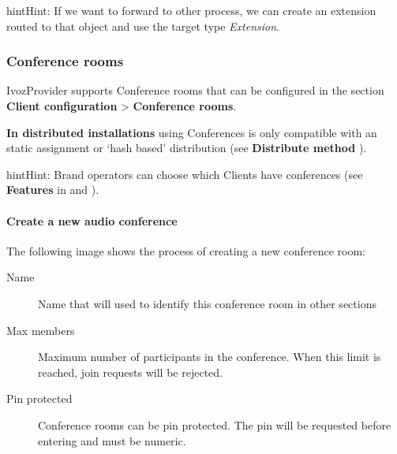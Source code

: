 \documentclass[letterpaper,10pt,english]{sphinxmanual}
\begin{document}
\begin{notice}{hint}{Hint:}
If we want to forward to other process, we can create an extension
routed to that object and use the target type \emph{Extension}.
\end{notice}


\subsubsection{Conference rooms}
\label{administration_portal/client/vpbx/routing_endpoints/conference_rooms::doc}\label{administration_portal/client/vpbx/routing_endpoints/conference_rooms:conference-rooms}\label{administration_portal/client/vpbx/routing_endpoints/conference_rooms:id1}
IvozProvider supports Conference rooms that can be configured in the section
\textbf{Client configuration} \textgreater{} \textbf{Conference rooms}.

\textbf{In distributed installations} using Conferences is only compatible with an static
assignment or `hash based' distribution (see \textbf{Distribute method} {\hyperref[administration_portal/brand/clients/virtual_pbx:virtual\string-pbx]{}}).

\begin{notice}{hint}{Hint:}
Brand operators can choose which Clients have conferences (see \textbf{Features}
in {\hyperref[getting_started/internal_calls/brand_portal:brand\string-configuration]{}} and {\hyperref[getting_started/internal_calls/client_portal:client\string-configuration]{}}).
\end{notice}
\paragraph{Create a new audio conference}

The following image shows the process of creating a new conference room:
\begin{description}
\item[{Name}] \leavevmode{}\label{administration_portal/client/vpbx/routing_endpoints/conference_rooms:term-name}
Name that will used to identify this conference room in other sections

\item[{Max members}] \leavevmode{}\label{administration_portal/client/vpbx/routing_endpoints/conference_rooms:term-max-members}
Maximum number of participants in the conference. When this limit is
reached, join requests will be rejected.

\item[{Pin protected}] \leavevmode{}\label{administration_portal/client/vpbx/routing_endpoints/conference_rooms:term-pin-protected}
Conference rooms can be pin protected. The pin will be requested before
entering and must be numeric.

\end{description}
\end{document}
